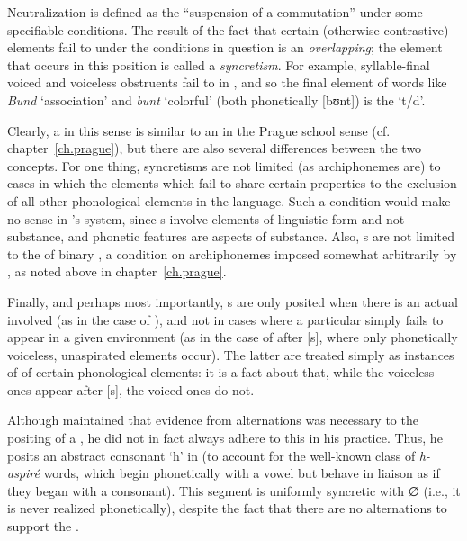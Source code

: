 Neutralization is defined as the ``suspension of a commutation'' under
some specifiable conditions. The result of the fact that certain
(otherwise contrastive) elements fail to  under the conditions
in question is an \emph{overlapping}; the element that occurs in this
position is called a \emph{syncretism}. For example, syllable-final
voiced and voiceless obstruents fail to  in , and so the
final element of words like \emph{Bund} `association' and \emph{bunt}
`colorful' (both phonetically {[bʊnt]}) is the  `t/d'.

Clearly, a  in this sense is similar to an  in
the Prague school sense (cf. chapter~\ref{ch.prague}), but there are
also several differences between the two concepts. For one thing,
syncretisms are not limited (as archiphonemes are) to cases in which
the elements which fail to  share certain properties to the
exclusion of all other phonological elements in the language. Such a
condition would make no sense in {\Hjelmslev}'s system, since s
involve elements of linguistic form and not substance, and phonetic
features are aspects of substance. Also, s are not limited
to the  of binary , a condition on
archiphonemes imposed somewhat arbitrarily by {\Trubetzkoy}, as noted
above in chapter~\ref{ch.prague}.

Finally, and perhaps most importantly, s are only posited
when there is an actual  involved (as in the case of 
), and not in cases where a particular  simply
fails to appear in a given environment (as in the case of 
 after {[s]}, where only phonetically voiceless, unaspirated
elements occur). The latter are treated simply as instances of
 of certain phonological elements: it is a fact
about   that, while the voiceless ones appear after {[s]},
the voiced ones do not.

Although {\Hjelmslev} maintained that evidence from alternations was
necessary to the positing of a , he did not in fact always
adhere to this in his practice. Thus, he posits an abstract consonant
`h' in  (to account for the well-known class of \emph{h-aspiré}
words, which begin phonetically with a vowel but behave in liaison as
if they began with a consonant). This segment is uniformly syncretic
with ∅ (i.e., it is never realized phonetically), despite the fact
that there are no alternations to support the .

